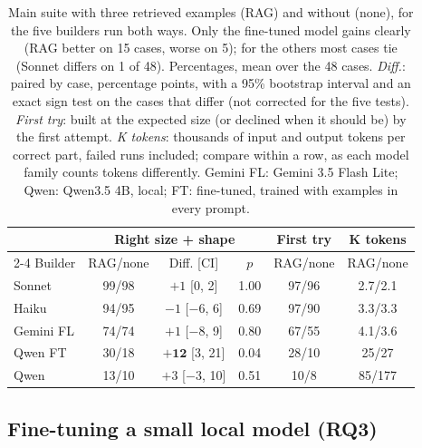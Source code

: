 \begin{table}[t]
  \centering
  \small
  \setlength{\tabcolsep}{2pt}
  \begin{tabular}{@{}lccccc@{}}
    \toprule
    & \multicolumn{3}{c}{Right size + shape} & First try & K tokens \\
    \cmidrule(lr){2-4}
    Builder & RAG/none & Diff. [CI] & $p$ & RAG/none & RAG/none \\
    \midrule
    Sonnet& 99/98 & $+1$ [0, 2]               & 1.00 & 97/96 & 2.7/2.1 \\
    Haiku& 94/95 & $-1$ [$-6$, 6]            & 0.69 & 97/90 & 3.3/3.3 \\
    Gemini FL& 74/74 & $+1$ [$-8$, 9]            & 0.80 & 67/55 & 4.1/3.6 \\
    Qwen FT& 30/18 & $\mathbf{+12}$ [3, 21]    & 0.04 & 28/10 & 25/27 \\
    Qwen& 13/10 & $+3$ [$-3$, 10]           & 0.51 & 10/8  & 85/177 \\
    \bottomrule
  \end{tabular}
  \caption{Main suite with three retrieved examples (RAG) and without (none), for the five builders run both ways.
    Only the fine-tuned model gains clearly (RAG better on 15 cases, worse on 5); for the others most cases tie
    (Sonnet differs on 1 of 48). Percentages, mean over the 48 cases. \emph{Diff.}: paired by case, percentage points, with a 95\% bootstrap
    interval and an exact sign test on the cases that differ (not corrected for the five tests). \emph{First try}: built at the expected size (or declined when it should be)
    by the first attempt. \emph{K tokens}: thousands of input and output tokens per correct part, failed runs included; compare
    within a row, as each model family counts tokens differently. Gemini FL: Gemini 3.5 Flash Lite; Qwen: Qwen3.5 4B, local;
    FT: fine-tuned, trained with examples in every prompt.}
  \label{tab:rag}
\end{table}

\subsection{Fine-tuning a small local model (RQ3)}
\label{sec:res-ft}

